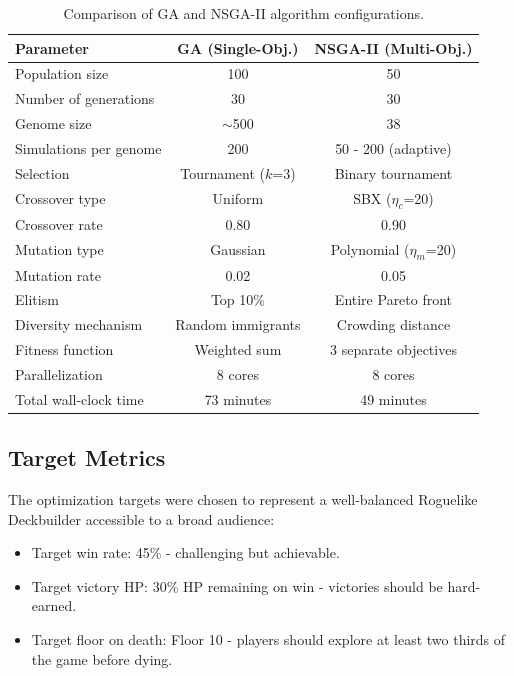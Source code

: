 \begin{table}[htbp]
    \centering
    \caption{Comparison of GA and NSGA-II algorithm configurations.}
    \label{tab:alg_params}
    \begin{tabular}{lcc}
        \toprule
        Parameter            & GA (Single-Obj.) & NSGA-II (Multi-Obj.) \\
        \midrule
        Population size               & 100        & 50 \\
        Number of generations         & 30         & 30 \\
        Genome size                   & $\sim$500  & 38 \\
        Simulations per genome        & 200        & 50 - 200 (adaptive) \\
        Selection                     & Tournament ($k$=3) & Binary tournament \\
        Crossover type                & Uniform    & SBX ($\eta_c$=20) \\
        Crossover rate                & 0.80       & 0.90 \\
        Mutation type                 & Gaussian   & Polynomial ($\eta_m$=20) \\
        Mutation rate                 & 0.02       & 0.05 \\
        Elitism                       & Top 10\%   & Entire Pareto front \\
        Diversity mechanism           & Random immigrants & Crowding distance \\
        Fitness function              & Weighted sum & 3 separate objectives \\
        Parallelization               & 8 cores    & 8 cores \\
        Total wall-clock time         & 73 minutes & 49 minutes \\
        \bottomrule
    \end{tabular}
\end{table}

\subsection{Target Metrics}

The optimization targets were chosen to represent a well-balanced Roguelike Deckbuilder accessible to a broad audience:
\begin{itemize}
    \item Target win rate: 45\% - challenging but achievable.
    \item Target victory HP: 30\% HP remaining on win - victories should be hard-earned.
    \item Target floor on death: Floor 10 - players should explore at least two thirds of the game before dying.
\end{itemize}

